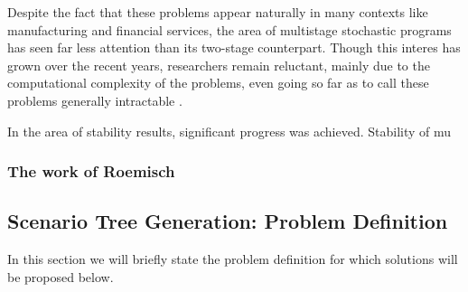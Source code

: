 \documentclass[a4paper, 12pt] {article}
\begin{document}
Despite the fact that these problems appear naturally in many contexts like manufacturing and financial services, the area of multistage stochastic programs has seen far less attention than its two-stage counterpart. Though this interes has grown over the recent years, researchers remain reluctant, mainly due to the computational complexity of the problems, even going so far as to call these problems generally intractable \cite{Shapiro2005}.



In the area of stability results, significant progress was achieved. Stability of mu
\subsubsection{The work of Roemisch}
\subsection{Scenario Tree Generation: Problem Definition}
In this section we will briefly state the problem definition for which solutions will be proposed below.
\end{document}
